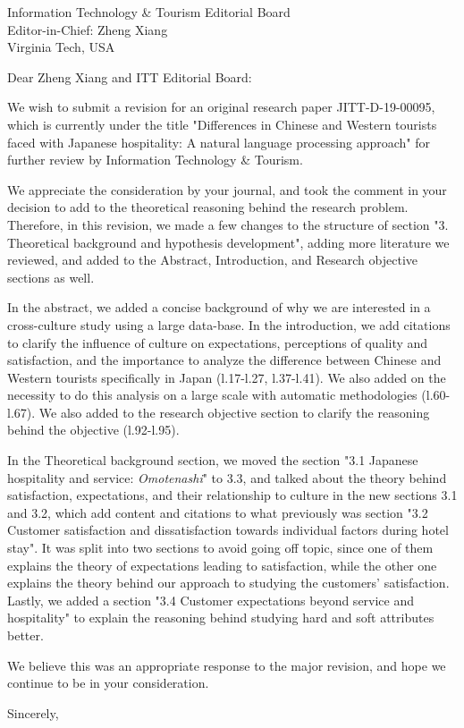 \documentclass{letter}
\begin{document}
\begin{letter}{
Information Technology \& Tourism Editorial Board \\
Editor-in-Chief:  Zheng Xiang\\
Virginia Tech, USA}

\opening{Dear Zheng Xiang and ITT Editorial Board:}

We wish to submit a revision for an original research paper JITT-D-19-00095, which is currently under the title "Differences in Chinese and Western tourists faced with Japanese hospitality: A natural language processing approach" for further review by Information Technology \& Tourism.

We appreciate the consideration by your journal, and took the comment in your decision to add to the theoretical reasoning behind the research problem. Therefore, in this revision, we made a few changes to the structure of section "3. Theoretical background and hypothesis development", adding more literature we reviewed, and added to the Abstract, Introduction, and Research objective sections as well. 

In the abstract, we added a concise background of why we are interested in a cross-culture study using a large data-base. In the introduction, we add citations to clarify the influence of culture on expectations, perceptions of quality and satisfaction, and the importance to analyze the difference between Chinese and Western tourists specifically in Japan (l.17-l.27, l.37-l.41). We also added on the necessity to do this analysis on a large scale with automatic methodologies (l.60-l.67). We also added to the research objective section to clarify the reasoning behind the objective (l.92-l.95). 

In the Theoretical background section, we moved the section "3.1 Japanese hospitality and service: \textit{Omotenashi}" to 3.3, and talked about the theory behind satisfaction, expectations, and their relationship to culture in the new sections 3.1 and 3.2, which add content and citations to what previously was section "3.2 Customer satisfaction and dissatisfaction towards individual factors during hotel stay". It was split into two sections to avoid going off topic, since one of them explains the theory of expectations leading to satisfaction, while the other one explains the theory behind our approach to studying the customers' satisfaction. Lastly, we added a section "3.4 Customer expectations beyond service and hospitality" to explain the reasoning behind studying hard and soft attributes better.

We believe this was an appropriate response to the major revision, and hope we continue to be in your consideration.

\closing{Sincerely,}


\end{letter}
\end{document}

